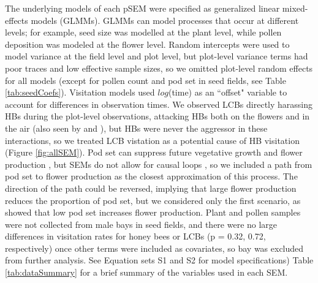 \documentclass[12pt]{article} %
\begin{document}
The underlying models of each pSEM were specified as generalized linear mixed-effects models (GLMMs).
GLMMs can model processes that occur at different levels; for example, seed size was modelled at the plant level, while pollen deposition was modeled at the flower level.
Random intercepts were used to model variance at the field level and plot level, but plot-level variance terms had poor traces and low effective sample sizes, so we omitted plot-level random effects for all models (except for pollen count and pod set in seed fields, see Table \ref{tab:seedCoefs}).
Visitation models used $log$(time) as an ``offset" variable to account for differences in observation times.
We observed LCBs directly harassing HBs during the plot-level observations, attacking HBs both on the flowers and in the air (also seen by \citealp{batra1978} and \citealp{waytesMsc}), but HBs were never the aggressor in these interactions, so we treated LCB vistation as a potential cause of HB visitation (Figure \ref{fig:allSEM}).
Pod set can suppress future vegetative growth and flower production \citep{stephenson1981}, but SEMs do not allow for causal loops \citep{grace2012}, so we included a path from pod set to flower production as the closest approximation of this process.
The direction of the path could be reversed, implying that large flower production reduces the proportion of pod set, but we considered only the first scenario, as \citet{sabbahi2006} showed that low pod set increases flower production.
Plant and pollen samples were not collected from male bays in seed fields, and there were no large differences in visitation rates for honey bees or LCBs (p = 0.32, 0.72, respectively) once other terms were included as covariates, so bay was excluded from further analysis.
See Equation sets S1 and S2 for model specifications) Table \ref{tab:dataSummary} for a brief summary of the variables used in each SEM.
\end{document}
